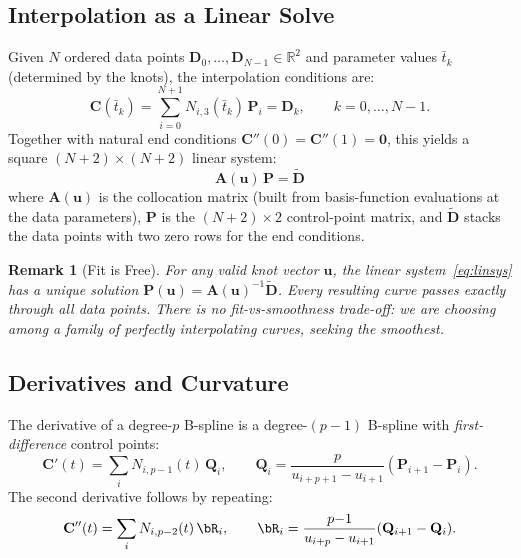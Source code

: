 \documentclass[11pt, a4paper]{article}
\newtheorem{remark}{Remark}
\newcommand{\R}{\mathbb{R}}
\newcommand{\bC}{\mathbf{C}}
\newcommand{\bD}{\mathbf{D}}
\newcommand{\bP}{\mathbf{P}}
\newcommand{\bA}{\mathbf{A}}
\newcommand{\bu}{\mathbf{u}}
\newcommand{\bQ}{\mathbf{Q}}
\begin{document}
\subsection{Interpolation as a Linear Solve}
\label{sec:interp}

Given $N$ ordered data points $\bD_0, \dots, \bD_{N-1} \in \R^2$ and
parameter values $\bar{t}_k$ (determined by the knots), the interpolation
conditions are:
\begin{equation}
  \bC(\bar{t}_k) = \sum_{i=0}^{N+1} N_{i,3}(\bar{t}_k)\,\bP_i = \bD_k,
  \qquad k = 0,\dots,N-1.
  \label{eq:interp_cond}
\end{equation}
Together with natural end conditions
$\bC''(0) = \bC''(1) = \mathbf{0}$, this yields a square
$(N{+}2) \times (N{+}2)$ linear system:
\begin{equation}
  \boxed{\;\bA(\bu)\,\bP = \tilde{\bD}\;}
  \label{eq:linsys}
\end{equation}
where $\bA(\bu)$ is the collocation matrix (built from basis-function
evaluations at the data parameters), $\bP$ is the $(N{+}2) \times 2$
control-point matrix, and $\tilde{\bD}$ stacks the data points with two
zero rows for the end conditions.

\begin{remark}[Fit is Free]
\label{rem:fit_free}
For \emph{any} valid knot vector $\bu$, the linear system~\eqref{eq:linsys}
has a unique solution $\bP(\bu) = \bA(\bu)^{-1}\tilde{\bD}$. Every
resulting curve passes exactly through all data points. There is no
fit-vs-smoothness trade-off: we are choosing among a family of perfectly
interpolating curves, seeking the smoothest.
\end{remark}


\subsection{Derivatives and Curvature}

The derivative of a degree-$p$ B-spline is a degree-$(p{-}1)$ B-spline
with \emph{first-difference} control points:
\begin{equation}
  \bC'(t) = \sum_i N_{i,p-1}(t)\,\bQ_i,\qquad
  \bQ_i = \frac{p}{u_{i+p+1} - u_{i+1}}(\bP_{i+1} - \bP_i).
  \label{eq:deriv1}
\end{equation}
The second derivative follows by repeating:
\begin{equation}
  \bC''(t) = \sum_i N_{i,p-2}(t)\,\bR_i,\qquad
  \bR_i = \frac{p{-}1}{u_{i+p} - u_{i+1}}(\bQ_{i+1} - \bQ_i).
  \label{eq:deriv2}
\end{equation}
\end{document}
